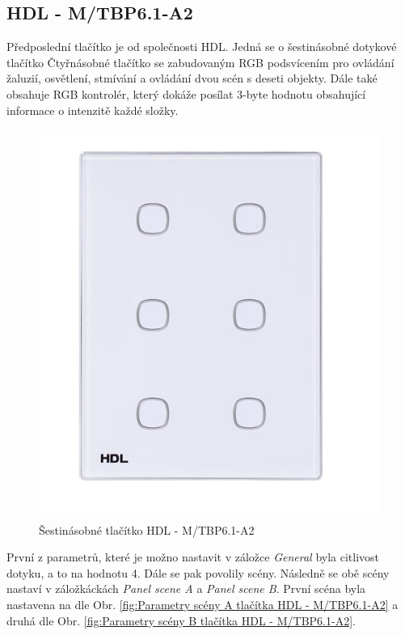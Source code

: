 \subsection{HDL - M/TBP6.1-A2}
Předposlední tlačítko je od společnosti HDL. Jedná se o šestinásobné dotykové tlačítko Čtyřnásobné tlačítko se zabudovaným RGB podsvícením pro ovládání žaluzií, osvětlení, stmívání a ovládání dvou scén s deseti objekty. Dále také obsahuje RGB kontrolér, který dokáže posílat 3-byte hodnotu obsahující informace o intenzitě každé složky. \cite{HDL}

\begin{figure}[!ht]
  \begin{center}
    \includegraphics[scale=0.25]{obrazky/HDL.jpg}
  \end{center}
  \caption[Šestinásobné tlačítko HDL - M/TBP6.1-A2 \cite{HDL}]{Šestinásobné tlačítko HDL - M/TBP6.1-A2 \cite{HDL}}
  \label{fig:Šestinásobné tlačítko HDL - M/TBP6.1-A2}
\end{figure}

První z parametrů, které je možno nastavit v záložce \textit{General} byla citlivost dotyku, a to na hodnotu 4. Dále se pak povolily scény. Následně se obě scény nastaví v záložkáckách \textit{Panel scene A} a \textit{Panel scene B}. První scéna byla nastavena na dle Obr. \ref{fig:Parametry scény A tlačítka HDL - M/TBP6.1-A2} a druhá dle Obr. \ref{fig:Parametry scény B tlačítka HDL - M/TBP6.1-A2}.

